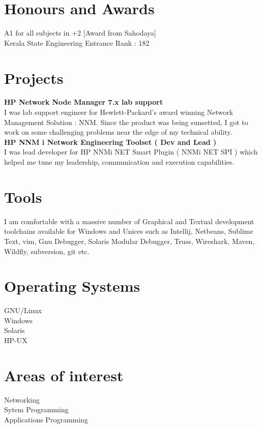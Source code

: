 \documentclass[line,margin]{res}
\begin{document}
\begin{resume}
\section{Honours and Awards}
A1 for all subjects in +2  [Award from Sahodaya]\\
Kerala State Engineering Entrance Rank : 182\\

\section{Projects}
{\bf HP Network Node Manager 7.x lab support}\\
I was lab support engineer for Hewlett-Packard's award winning Network Management Solution : NNM. Since the product was being sunsetted, I got to work on some challenging problems near the edge of my technical ability.\\

{\bf HP NNM i Network Engineering Toolset ( Dev and Lead )}\\
I was lead developer for HP NNMi NET Smart Plugin ( NNMi NET SPI ) which helped me tune my leadership, communication and execution capabilities.\\

\section{Tools}
I am comfortable with a massive number of Graphical and Textual development toolchains available for Windows and Unices such as Intellij, Netbeans, Sublime Text, vim, Gnu Debugger, Solaris Modular Debugger, Truss, Wireshark, Maven, Wildfly, subversion, git etc.\\

\section{Operating Systems}
GNU/Linux\\
Windows\\
Solaris\\
HP-UX\\

\section{Areas of interest}
Networking\\
Sytem Programming\\
Applications Programming\\


\end{resume}
\end{document}
